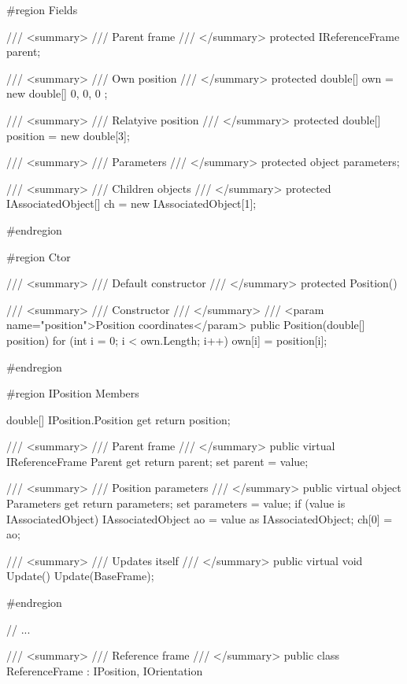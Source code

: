 \documentclass[10pt,journal,compsoc]{IEEEtran}
\begin{document}
{
	
	\#region Fields
	
	/// <summary>
	/// Parent frame
	/// </summary>
	protected IReferenceFrame parent;
	
	/// <summary>
	/// Own position
	/// </summary>
	protected double[] own = new double[] { 0, 0, 0 };
	
	/// <summary>
	/// Relatyive position
	/// </summary>
	protected double[] position = new double[3];
	
	/// <summary>
	/// Parameters
	/// </summary>
	protected object parameters;
	
	/// <summary>
	/// Children objects
	/// </summary>
	protected IAssociatedObject[] ch = new IAssociatedObject[1];
	
	\#endregion
	
	\#region Ctor
	
	/// <summary>
	/// Default constructor
	/// </summary>
	protected Position()
	{
	}
	
	/// <summary>
	/// Constructor
	/// </summary>
	/// <param name="position">Position coordinates</param>
	public Position(double[] position)
	{
		for (int i = 0; i < own.Length; i++)
		{
			own[i] = position[i];
		}
	}
	
	\#endregion
	
	\#region IPosition Members
	
	double[] IPosition.Position
	{
		get { return position; }
	}
	
	/// <summary>
	/// Parent frame
	/// </summary>
	public virtual IReferenceFrame Parent
	{
		get
		{
			return parent;
		}
		set
		{
			parent = value;
		}
	}
	
	/// <summary>
	/// Position parameters
	/// </summary>
	public virtual object Parameters
	{
		get
		{
			return parameters;
		}
		set
		{
			parameters = value;
			if (value is IAssociatedObject)
			{
				IAssociatedObject ao = value as IAssociatedObject;
				ch[0] = ao;
			}
		}
	}
	
	/// <summary>
	/// Updates itself
	/// </summary>
	public virtual void Update()
	{
		Update(BaseFrame);
	}
	
	\#endregion
	
	// ...
}
/// <summary>
/// Reference frame
/// </summary>
public class ReferenceFrame : IPosition, IOrientation
\end{document}
